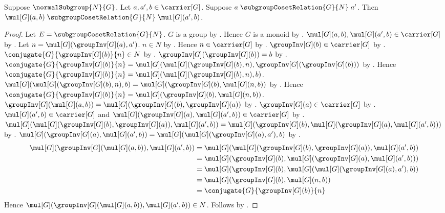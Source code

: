 \begin{lemma}\label{normal_coset_relation_right_mul}
    Suppose $\normalSubgroup{N}{G}$.
    Let $a,a',b\in\carrier[G]$.
    Suppose
        $a\mathrel{\subgroupCosetRelation{G}{N}}a'$.
    Then
        $\mul[G](a,b)
            \mathrel{\subgroupCosetRelation{G}{N}}
        \mul[G](a',b)$.
\end{lemma}
\begin{proof}
    Let $E=\subgroupCosetRelation{G}{N}$.
    $G$ is a group by .
    Hence $G$ is a monoid by .
    $\mul[G](a,b),\mul[G](a',b)\in\carrier[G]$ by
        .
    Let $n=\mul[G](\groupInv[G](a),a')$.
    $n\in N$ by .
    Hence $n\in\carrier[G]$ by
        .
    $\groupInv[G](b)\in\carrier[G]$ by .
    $\conjugate{G}{\groupInv[G](b)}{n}\in N$ by
        .
    $\groupInv[G](\groupInv[G](b))=b$ by
        .
    $\conjugate{G}{\groupInv[G](b)}{n}
        =\mul[G]
            (\mul[G](\groupInv[G](b),n),
             \groupInv[G](\groupInv[G](b)))$ by
        .
    Hence
        $\conjugate{G}{\groupInv[G](b)}{n}
            =\mul[G](\mul[G](\groupInv[G](b),n),b)$.
    $\mul[G](\mul[G](\groupInv[G](b),n),b)
        =\mul[G](\groupInv[G](b),\mul[G](n,b))$ by
        .
    Hence
        $\conjugate{G}{\groupInv[G](b)}{n}
            =\mul[G](\groupInv[G](b),\mul[G](n,b))$.
    $\groupInv[G](\mul[G](a,b))=
        \mul[G](\groupInv[G](b),\groupInv[G](a))$ by
        .
    $\groupInv[G](a)\in\carrier[G]$ by
        .
    $\mul[G](a',b)\in\carrier[G]$ and
        $\mul[G](\groupInv[G](a),\mul[G](a',b))\in\carrier[G]$ by
        .
    $\mul[G]
        (\mul[G](\groupInv[G](b),\groupInv[G](a)),
         \mul[G](a',b))
        =\mul[G]
            (\groupInv[G](b),
             \mul[G](\groupInv[G](a),\mul[G](a',b)))$ by
        .
    $\mul[G](\groupInv[G](a),\mul[G](a',b))
        =\mul[G](\mul[G](\groupInv[G](a),a'),b)$ by
        .
    \begin{align*}
        \mul[G](\groupInv[G](\mul[G](a,b)),\mul[G](a',b))
            &= \mul[G]
                (\mul[G](\groupInv[G](b),\groupInv[G](a)),
                 \mul[G](a',b))
            \\
            &= \mul[G]
                (\groupInv[G](b),
                 \mul[G](\groupInv[G](a),\mul[G](a',b)))
            \\
            &= \mul[G]
                (\groupInv[G](b),
                 \mul[G](\mul[G](\groupInv[G](a),a'),b))
            \\
            &= \mul[G](\groupInv[G](b),\mul[G](n,b))
            \\
            &= \conjugate{G}{\groupInv[G](b)}{n}
    \end{align*}
    Hence
        $\mul[G]
            (\groupInv[G](\mul[G](a,b)),\mul[G](a',b))\in N$.
    Follows by .
\end{proof}

